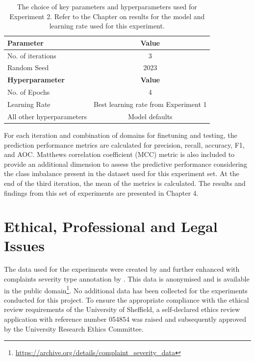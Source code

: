 \begin{table}[ht]
    \captionsetup{font=small}
    \small
    \centering
    \begin{tabularx}{\textwidth}{|X|c|}
        \hline
        \rowcolor[gray]{0.7}
        \textbf{Parameter}        & \textbf{Value}                       \\
        \hline
        No. of iterations         & 3                                    \\
        \rowcolor[gray]{0.9}
        Random Seed               & 2023                                 \\
        \hline
        \hline
        \rowcolor[gray]{0.7}
        \textbf{Hyperparameter}   & \textbf{Value}                       \\
        \hline
        No. of Epochs             & 4                                    \\
        \rowcolor[gray]{0.9}
        Learning Rate             & Best learning rate from Experiment 1 \\
        All other hyperparameters & Model defaults                       \\
        \hline
    \end{tabularx}
    \caption{The choice of key parameters and hyperparameters used for Experiment 2. Refer to the Chapter on results for the model and learning rate used for this experiment. }
    \label{tab: exp2_params}
\end{table}
For each iteration and combination of domains for finetuning and testing, the prediction performance metrics are calculated for precision, recall, accuracy, F1, and AOC. Matthews correlation coefficient (MCC) metric \cite{chiccoAdvantagesMatthewsCorrelation2020} is also included to provide an additional dimension to assess the predictive performance considering the class imbalance present in the dataset used for this experiment set. At the end of the third iteration, the mean of the metrics is calculated. The results and findings from this set of experiments are presented in Chapter 4.

\section{Ethical, Professional and Legal Issues}
The data used for the experiments were created by \cite{preotiuc-pietro_automatically_2019} and further enhanced with complaints severity type annotation by \cite{jinModelingSeverityComplaints2021}. This data is anonymised and is available in the public domain\footnote{\url{ https://archive.org/details/complaint_severity_data}}. No additional data has been collected for the experiments conducted for this project. To ensure the appropriate compliance with the ethical review requirements of the University of Sheffield, a self-declared ethics review application with reference number 054854 was raised and subsequently approved by the University Research Ethics Committee.
